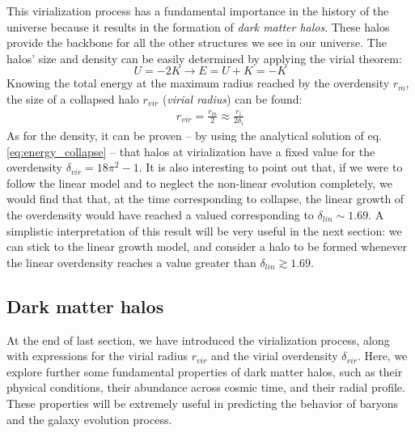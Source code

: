   This virialization process has a fundamental importance in the history of the universe because it results in the formation of \textit{dark matter halos}. These halos provide the backbone for all the other structures we see in our universe. The halos' size and density can be easily determined by applying the virial theorem:
  \begin{equation}
    U = -2K \rightarrow E = U + K = -K 
 \end{equation}
  Knowing the total energy at the maximum radius reached by the overdensity $r_m$, the size of a collapsed halo $r_{vir}$ (\textit{virial radius}) can be found: 
  \begin{align}
    r_{vir} = \frac{r_m}{2} \approx \frac{r_i}{2\delta_i}
  \end{align}
  As for the density, it can be proven -- by using the analytical solution of eq. \ref{eq:energy_collapse} -- that halos at virialization have a fixed value for the overdensity $\delta_{vir} = 18\pi^2 -1$.
  It is also interesting to point out that, if we were to follow the linear model and to neglect the non-linear evolution completely, we would find that that, at the time corresponding to collapse, the linear growth of the overdensity would have reached a valued corresponding to $\delta_{lin}\sim 1.69$. A simplistic interpretation of this result will be very useful in the next section: we can stick to the linear growth model, and consider a halo to be formed whenever the linear overdensity reaches a value greater than $\delta_{lin}\gtrsim 1.69$.
  
  
  
  



 
 \subsection{Dark matter halos} \label{sec:halos}
 
 At the end of last section, we have introduced the virialization process, along with expressions for the virial radius $r_{vir}$ and the virial overdensity $\delta_{vir}$. Here, we explore further some fundamental properties of dark matter halos, such as their physical conditions, their abundance across cosmic time, and their radial profile. These properties will be extremely useful in predicting the behavior of baryons and the galaxy evolution process.
 
